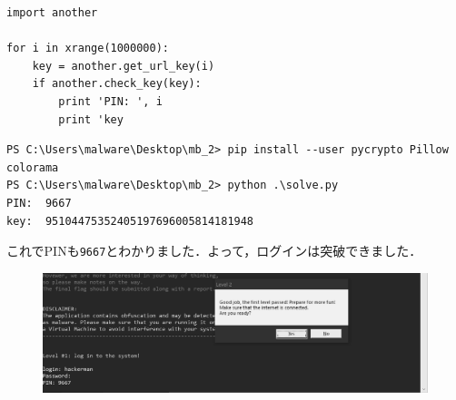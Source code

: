 \begin{tcolorbox}[title=作成したソルバーと実行結果, sharp corners, left=2mm]\scriptsize
\begin{verbatim}
import another

for i in xrange(1000000):
    key = another.get_url_key(i)
    if another.check_key(key):
        print 'PIN: ', i
        print 'key
\end{verbatim}
\begin{verbatim}
PS C:\Users\malware\Desktop\mb_2> pip install --user pycrypto Pillow colorama
PS C:\Users\malware\Desktop\mb_2> python .\solve.py
PIN:  9667
key:  95104475352405197696005814181948
\end{verbatim}
\end{tcolorbox}
これでPINも\texttt{9667}とわかりました．よって，ログインは突破できました\faAngellist ．
\begin{figure}[H]
    \centering
    \includegraphics[width=\linewidth]{./assets/takuzoo3868asset/crack_level1_gray.png}
    \label{fig:crack_level1}
\end{figure}


